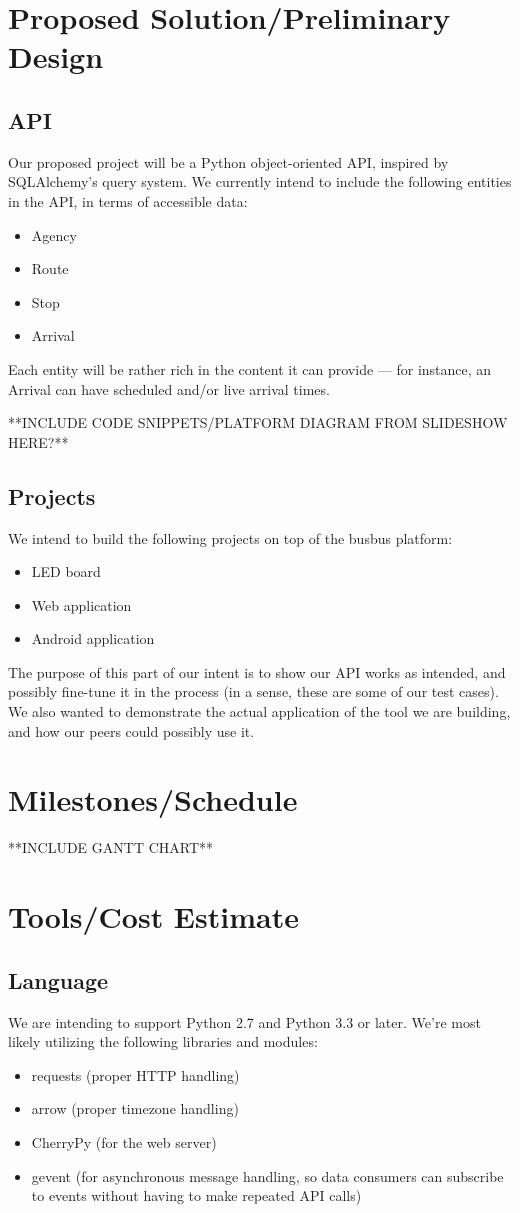 \documentclass[12pt]{article}
\begin{document}
\section{Proposed Solution/Preliminary Design}
\subsection{API}
Our proposed project will be a Python object-oriented API, inspired by SQLAlchemy's query system.
We currently intend to include the following entities in the API, in terms of accessible data:
\begin{itemize}
\item Agency
\item Route
\item Stop
\item Arrival
\end{itemize}
Each entity will be rather rich in the content it can provide --- for instance, an Arrival can have scheduled
and/or live arrival times.

**INCLUDE CODE SNIPPETS/PLATFORM DIAGRAM FROM SLIDESHOW HERE?**

\subsection{Projects}
We intend to build the following projects on top of the busbus platform:
\begin{itemize}
\item LED board
\item Web application
\item Android application
\end{itemize}
The purpose of this part of our intent is to show our API works as intended, and possibly
fine-tune it in the process (in a sense, these are some of our test cases). We also wanted 
to demonstrate the actual application of the tool we are building, and how our peers
could possibly use it.

\section{Milestones/Schedule}
**INCLUDE GANTT CHART**

\section{Tools/Cost Estimate}
\subsection{Language}
We are intending to support Python 2.7 and Python 3.3 or later. We're most likely utilizing the following
libraries and modules:
\begin{itemize}
\item requests (proper HTTP handling)
\item arrow (proper timezone handling)
\item CherryPy (for the web server)
\item gevent (for asynchronous message handling, so data consumers can subscribe to events
without having to make repeated API calls)
\end{itemize}
\end{document}
